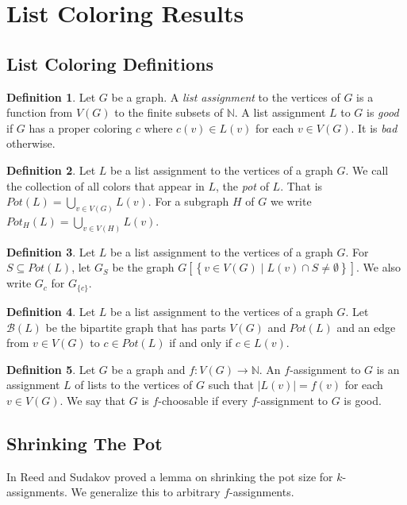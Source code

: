 \documentclass[12pt]{article}
\theoremstyle{plain}
\theoremstyle{definition}
\newtheorem{defn}{Definition}[section]
\theoremstyle{remark}
\newcommand{\fancy}[1]{\mathcal{#1}}
\newcommand{\setb}[3]{\left\{ #1 \in #2 \mid #3 \right\}}
\begin{document}
\section{List Coloring Results}
\subsection{List Coloring Definitions}
\begin{defn}
Let $G$ be a graph.  A \emph{list assignment} to the vertices of $G$ is a function from $V(G)$ to the finite subsets of
$\mathbb{N}$.  A list assignment $L$ to $G$ is \emph{good} if $G$ has a proper coloring $c$ where $c(v) \in L(v)$ for each 
$v \in V(G)$.  It is \emph{bad} otherwise.
\end{defn}

\begin{defn}
 Let $L$ be a list assignment to the vertices of a graph $G$.  We call the collection of all colors that
appear in $L$, the \emph{pot} of $L$.  That is $Pot(L) = \bigcup_{v \in V(G)} L(v)$.  For
a subgraph $H$ of $G$ we write $Pot_H(L) = \bigcup_{v \in V(H)} L(v)$.
\end{defn}

\begin{defn}
Let $L$ be a list assignment to the vertices of a graph $G$. For $S \subseteq Pot(L)$, let $G_S$ be the graph $G\left[\setb{v}{V(G)}{L(v) \cap S \neq \emptyset}\right]$.  We also write $G_c$ for $G_{\{c\}}$.
\end{defn}

\begin{defn}
Let $L$ be a list assignment to the vertices of a graph $G$. Let $\fancy{B}(L)$ be the bipartite graph that has parts $V(G)$ and $Pot(L)$ and an edge from $v \in V(G)$ to $c \in Pot(L)$ if and only if $c \in L(v)$.
\end{defn}

\begin{defn}
Let $G$ be a graph and $f: V(G) \rightarrow \mathbb{N}$.  An $f$-assignment to $G$ is an assignment $L$ of lists 
to the vertices of $G$ such that $|L(v)| = f(v)$ for each $v \in V(G)$.  
We say that $G$ is $f$-choosable if every $f$-assignment to $G$ is good.
\end{defn}

\subsection{Shrinking The Pot}
In \cite{ReedSudakov} Reed and Sudakov proved a lemma on shrinking the pot size for $k$-assignments.  We generalize this to arbitrary $f$-assignments.
\end{document}
